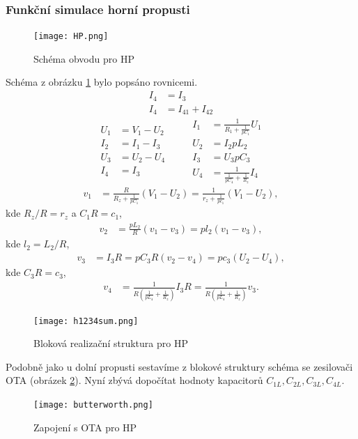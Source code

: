 \subsubsection{Funkční simulace horní propusti}
\begin{figure}[h]
\centering
\texttt{[image: HP.png]}
\caption{Schéma obvodu pro HP \label{s:HP12}}
\end{figure}
Schéma z obrázku \ref{s:HP12} bylo popsáno rovnicemi.
\begin{align}
I_4 &= I_3 \\
I_4 &= I_{41} + I_{42}
\end{align}
\begin{equation}
\begin{split}
U_1 &= V_1 - U_2 \\
I_2 &= I_1 - I_3 \\
U_3 &= U_2 - U_4 \\
I_4 &= I_3
\end{split}
\quad \quad
\begin{split}
I_1 &= \frac{1}{R_1 + \frac{1}{pC_1}}U_1\\
U_2 &= I_2pL_2 \\
I_3 &= U_3pC_3\\
U_4 &= \frac{1}{\frac{1}{pC_4} + \frac{1}{R_z}}I_4
\end{split}
\end{equation}
\begin{align}
v_1 &= \frac{R}{R_z + \frac{1}{pC_1}}(V_1 - U_2) = \frac{1}{r_z + \frac{1}{pc_1}}(V_1 - U_2),
\end{align}
kde $R_z/R = r_z$ a $C_1R = c_1$,
\begin{align}
v_2 &= \frac{pL_2}{R}(v_1 - v_3) = pl_2(v_1 - v_3),
\end{align}
kde $l_2 = L_2/R$,
\begin{align}
v_3 &= I_3R = pC_3R(v_2 - v_4) = pc_3(U_2 - U_4),
\end{align}
kde $C_3R = c_3$,
\begin{align}
v_4 &= \frac{1}{R(\frac{1}{pL_4} + \frac{1}{R_z})}I_3R = \frac{1}{R(\frac{1}{pL_4} + \frac{1}{R_z})}v_3.
\end{align}
\begin{figure}[h]
\centering
\texttt{[image: h1234sum.png]}
\caption{Bloková realizační struktura pro HP}
\end{figure}
Podobně jako u dolní propusti sestavíme z blokové struktury schéma se zesilovači OTA (obrázek \ref{s:OTAHP}). Nyní zbývá dopočítat hodnoty kapacitorů $C_{1L}, C_{2L}, C_{3L}, C_{4L}$. 
\begin{figure}[h]
\centering
\texttt{[image: butterworth.png]}
\caption{Zapojení s OTA pro HP \label{s:OTAHP}}
\end{figure}
